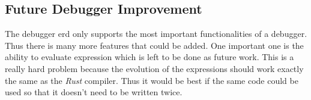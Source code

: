 \subsection{Future Debugger Improvement}
The debugger \gls{erd} only supports the most important functionalities of a debugger.
Thus there is many more features that could be added.
One important one is the ability to evaluate expression which is left to be done as future work.
This is a really hard problem because the evolution of the expressions should work exactly the same as the \emph{Rust} compiler.
Thus it would be best if the same code could be used so that it doesn't need to be written twice.




